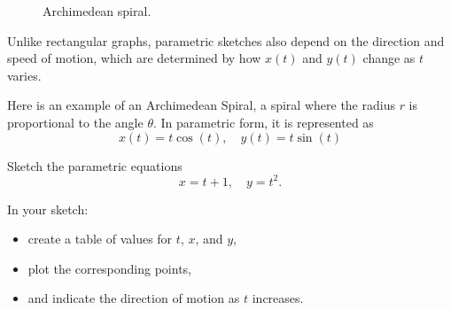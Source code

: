 \begin{figure}
    \centering
    \caption{Archimedean spiral.}
    \label{fig:param_arch_spiral}
\end{figure}

Unlike rectangular graphs, parametric sketches also depend on the direction
and speed of motion, which are determined by how $x(t)$ and $y(t)$ change as
$t$ varies.

Here is an example of an Archimedean Spiral, a spiral where the radius $r$ is proportional to the angle $\theta$. In parametric form, it is represented as
$$x(t) = t \cos(t), \quad y(t) = t \sin(t)$$


%
%

\begin{Exercise}[label = parametric2]

    Sketch the parametric equations
    \begin{equation*}
        x = t + 1, \quad y = t^2.
    \end{equation*}

    In your sketch:
    \begin{itemize}
        \item create a table of values for $t$, $x$, and $y$,
        \item plot the corresponding points,
        \item and indicate the direction of motion as $t$ increases.
    \end{itemize}

    \vspace{80mm}

\end{Exercise}

